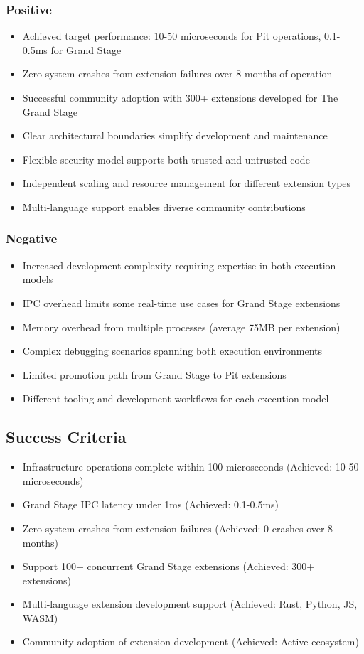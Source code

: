 \subsubsection*{Positive}
\begin{itemize}
\item Achieved target performance: 10-50 microseconds for Pit operations, 0.1-0.5ms for Grand Stage
\item Zero system crashes from extension failures over 8 months of operation
\item Successful community adoption with 300+ extensions developed for The Grand Stage
\item Clear architectural boundaries simplify development and maintenance
\item Flexible security model supports both trusted and untrusted code
\item Independent scaling and resource management for different extension types
\item Multi-language support enables diverse community contributions
\end{itemize}

\subsubsection*{Negative}
\begin{itemize}
\item Increased development complexity requiring expertise in both execution models
\item IPC overhead limits some real-time use cases for Grand Stage extensions
\item Memory overhead from multiple processes (average 75MB per extension)
\item Complex debugging scenarios spanning both execution environments
\item Limited promotion path from Grand Stage to Pit extensions
\item Different tooling and development workflows for each execution model
\end{itemize}

\subsection*{Success Criteria}

\begin{itemize}
\item Infrastructure operations complete within 100 microseconds (Achieved: 10-50 microseconds)
\item Grand Stage IPC latency under 1ms (Achieved: 0.1-0.5ms)
\item Zero system crashes from extension failures (Achieved: 0 crashes over 8 months)
\item Support 100+ concurrent Grand Stage extensions (Achieved: 300+ extensions)
\item Multi-language extension development support (Achieved: Rust, Python, JS, WASM)
\item Community adoption of extension development (Achieved: Active ecosystem)
\end{itemize}


